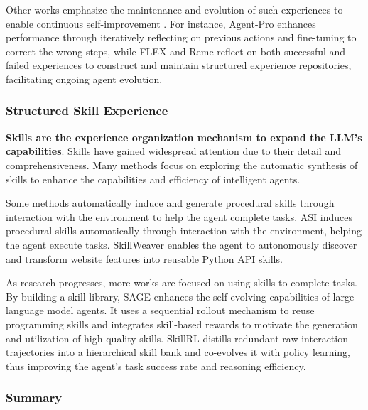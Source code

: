 \documentclass{llmxive}
\begin{document}
Other works emphasize the maintenance and evolution of such experiences to enable continuous self-improvement \cite{Agent-Pro, FLEX, Training-Free_GRPO}. For instance, Agent-Pro \cite{Agent-Pro} enhances performance through iteratively reflecting on previous actions and fine-tuning to correct the wrong steps, while FLEX \cite{FLEX} and Reme \cite{Reme} reflect on both successful and failed experiences to construct and maintain structured experience repositories, facilitating ongoing agent evolution.

\subsubsection{Structured Skill Experience}
\label{sec:structure_skill_experience}
\textbf{Skills are the experience organization mechanism to expand the LLM's capabilities}. Skills have gained widespread attention due to their detail and comprehensiveness. Many methods focus on exploring the automatic synthesis of skills to enhance the capabilities and efficiency of intelligent agents.

Some methods automatically induce and generate procedural skills through interaction with the environment to help the agent complete tasks. ASI \cite{ASI} induces procedural skills automatically through interaction with the environment, helping the agent execute tasks. SkillWeaver \cite{SkillWeaver} enables the agent to autonomously discover and transform website features into reusable Python API skills. 

As research progresses, more works are focused on using skills to complete tasks. By building a skill library, SAGE \cite{SAGE} enhances the self-evolving capabilities of large language model agents. It uses a sequential rollout mechanism to reuse programming skills and integrates skill-based rewards to motivate the generation and utilization of high-quality skills. SkillRL \cite{SkillRL_2} distills redundant raw interaction trajectories into a hierarchical skill bank and co-evolves it with policy learning, thus improving the agent's task success rate and reasoning efficiency.


\subsubsection{Summary}
\end{document}
